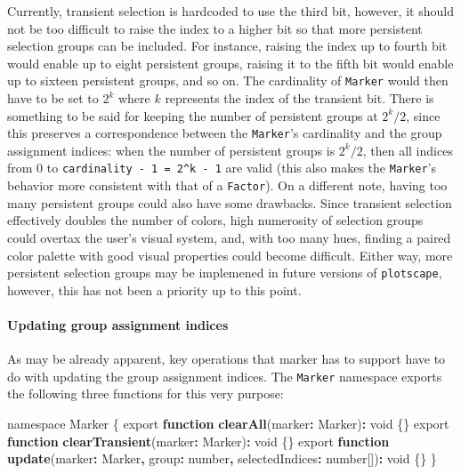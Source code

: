 \documentclass[
  openany]{book}
\newenvironment{Shaded}{\begin{snugshade}}{\end{snugshade}}
\newcommand{\DataTypeTok}[1]{\textcolor[rgb]{0.13,0.29,0.53}{#1}}
\newcommand{\FunctionTok}[1]{\textcolor[rgb]{0.13,0.29,0.53}{\textbf{#1}}}
\newcommand{\ImportTok}[1]{#1}
\newcommand{\KeywordTok}[1]{\textcolor[rgb]{0.13,0.29,0.53}{\textbf{#1}}}
\newcommand{\NormalTok}[1]{#1}
\newcommand{\OperatorTok}[1]{\textcolor[rgb]{0.81,0.36,0.00}{\textbf{#1}}}
\theoremstyle{definition}
\theoremstyle{definition}
\theoremstyle{definition}
\theoremstyle{definition}
\theoremstyle{remark}
\begin{document}
Currently, transient selection is hardcoded to use the third bit, however, it should not be too difficult to raise the index to a higher bit so that more persistent selection groups can be included. For instance, raising the index up to fourth bit would enable up to eight persistent groups, raising it to the fifth bit would enable up to sixteen persistent groups, and so on. The cardinality of \texttt{Marker} would then have to be set to \(2^k\) where \(k\) represents the index of the transient bit. There is something to be said for keeping the number of persistent groups at \(2^k / 2\), since this preserves a correspondence between the \texttt{Marker}'s cardinality and the group assignment indices: when the number of persistent groups is \(2^k / 2\), then all indices from 0 to \texttt{cardinality\ -\ 1\ =\ 2\^{}k\ -\ 1} are valid (this also makes the \texttt{Marker}'s behavior more consistent with that of a \texttt{Factor}). On a different note, having too many persistent groups could also have some drawbacks. Since transient selection effectively doubles the number of colors, high numerosity of selection groups could overtax the user's visual system, and, with too many hues, finding a paired color palette with good visual properties could become difficult. Either way, more persistent selection groups may be implemened in future versions of \texttt{plotscape}, however, this has not been a priority up to this point.

\paragraph{Updating group assignment indices}\label{updating-group-assignment-indices}

As may be already apparent, key operations that marker has to support have to do with updating the group assignment indices. The \texttt{Marker} namespace exports the following three functions for this very purpose:

\begin{Shaded}
\begin{Highlighting}[]
\ImportTok{namespace} \DataTypeTok{Marker}\NormalTok{ \{}
  \ImportTok{export} \KeywordTok{function} \FunctionTok{clearAll}\NormalTok{(marker}\OperatorTok{:}\NormalTok{ Marker)}\OperatorTok{:} \DataTypeTok{void}\NormalTok{ \{\}}
  \ImportTok{export} \KeywordTok{function} \FunctionTok{clearTransient}\NormalTok{(marker}\OperatorTok{:}\NormalTok{ Marker)}\OperatorTok{:} \DataTypeTok{void}\NormalTok{ \{\}}
  \ImportTok{export} \KeywordTok{function} \FunctionTok{update}\NormalTok{(marker}\OperatorTok{:}\NormalTok{ Marker}\OperatorTok{,}\NormalTok{ group}\OperatorTok{:} \DataTypeTok{number}\OperatorTok{,} 
\NormalTok{                         selectedIndices}\OperatorTok{:} \DataTypeTok{number}\NormalTok{[])}\OperatorTok{:} \DataTypeTok{void}\NormalTok{ \{\}}
\NormalTok{\}}
\end{Highlighting}
\end{Shaded}
\end{document}
